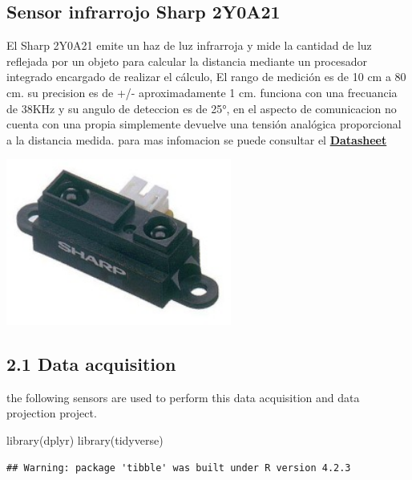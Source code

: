 \documentclass[
]{article}
\newenvironment{Shaded}{\begin{snugshade}}{\end{snugshade}}
\newcommand{\FunctionTok}[1]{\textcolor[rgb]{0.00,0.00,0.00}{#1}}
\newcommand{\NormalTok}[1]{#1}
\begin{document}
\hypertarget{sensor-infrarrojo-sharp-2y0a21}{%
\subsection{Sensor infrarrojo Sharp
2Y0A21}\label{sensor-infrarrojo-sharp-2y0a21}}

El Sharp 2Y0A21 emite un haz de luz infrarroja y mide la cantidad de luz
reflejada por un objeto para calcular la distancia mediante un
procesador integrado encargado de realizar el cálculo, El rango de
medición es de 10 cm a 80 cm. su precision es de +/- aproximadamente 1
cm. funciona con una frecuancia de 38KHz y su angulo de deteccion es de
25°, en el aspecto de comunicacion no cuenta con una propia simplemente
devuelve una tensión analógica proporcional a la distancia medida. para
mas infomacion se puede consultar el
\href{https://global.sharp/products/device/lineup/data/pdf/datasheet/gp2y0a21yk_e.pdf}{\textbf{Datasheet}}

\includegraphics[width=2.91667in,height=\textheight]{images/2y.PNG}

\hypertarget{data-acquisition-1}{%
\subsection{2.1 Data acquisition}\label{data-acquisition-1}}

the following sensors are used to perform this data acquisition and data
projection project.

\begin{Shaded}
\begin{Highlighting}[]
\FunctionTok{library}\NormalTok{(dplyr)}
\FunctionTok{library}\NormalTok{(tidyverse)}
\end{Highlighting}
\end{Shaded}

\begin{verbatim}
## Warning: package 'tibble' was built under R version 4.2.3
\end{verbatim}
\end{document}
